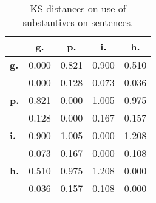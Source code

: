 \begin{table}[h!]
\begin{center}
\begin{tabular}{| l || c | c | c | c |}\hline
 & {\bf g.} & {\bf p.} & {\bf i.} & {\bf h.} \\\hline\hline
{\bf g.} & 0.000 & 0.821 & 0.900 & 0.510 \\
{\bf } & 0.000 & 0.128 & 0.073 & 0.036 \\\hline
{\bf p.} & 0.821 & 0.000 & 1.005 & 0.975 \\
{\bf } & 0.128 & 0.000 & 0.167 & 0.157 \\\hline
{\bf i.} & 0.900 & 1.005 & 0.000 & 1.208 \\
{\bf } & 0.073 & 0.167 & 0.000 & 0.108 \\\hline
{\bf h.} & 0.510 & 0.975 & 1.208 & 0.000 \\
{\bf } & 0.036 & 0.157 & 0.108 & 0.000 \\\hline
\end{tabular}
\caption{KS distances on use of substantives on sentences.}
\end{center}
\end{table}